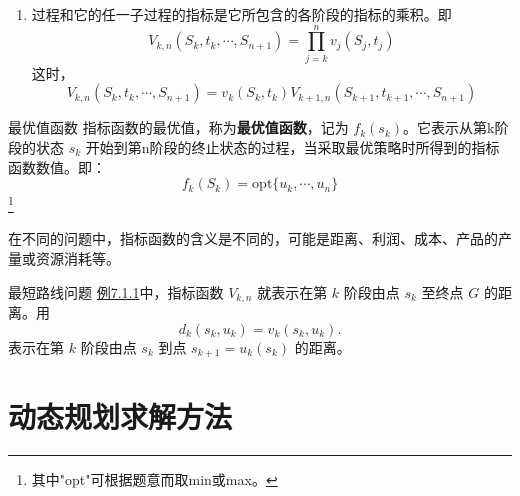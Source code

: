 \begin{enumerate}
\begin{enumerate}[label=(\arabic*)]
    \item 过程和它的任一子过程的指标是它所包含的各阶段的指标的乘积。即
    \[V_{k,n}(S_k, t_k, \cdots, S_{n+1}) = \prod_{j=k}^{n} v_j(S_j, t_j)\]
    这时，
    \[V_{k,n}(S_k, t_k, \cdots, S_{n+1}) = v_k(S_k, t_k) V_{k+1,n}(S_{k+1}, t_{k+1}, \cdots, S_{n+1})\]
\end{enumerate}
\begin{dfnbox}{最优值函数}{}
指标函数的最优值，称为\textbf{最优值函数}，记为 \( f_k(s_k) \)。它表示从第k阶段的状态 \( s_k \) 开始到第n阶段的终止状态的过程，当采取最优策略时所得到的指标函数数值。即：
\[f_k(S_k) = \text{opt} \{ u_k, \cdots, u_n \}\]\footnote{其中"opt"可根据题意而取min或max。}
\end{dfnbox}
在不同的问题中，指标函数的含义是不同的，可能是距离、利润、成本、产品的产量或资源消耗等。
\begin{exbox}{最短路线问题}{}
\hyperref[eg:7.1.1]{例7.1.1}中，指标函数 \( V_{k,n} \) 就表示在第 \( k \) 阶段由点 \( s_k \) 至终点 \( G \) 的距离。用
\[d_k(s_k, u_k) = v_k(s_k, u_k).\]
表示在第 \( k \) 阶段由点 \( s_k \) 到点 \( s_{k+1} = u_k(s_k) \) 的距离。
\end{exbox}
\end{enumerate}


\section{动态规划求解方法}
